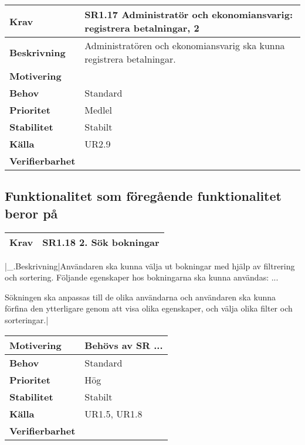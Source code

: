\documentclass[a4paper, twoside, 11pt, titlepage]{article}
\begin{document}
	\begin{tabular} { p{2.6cm} p{12.5cm} }
		\hline
		\sffamily\textbf{Krav} & \sffamily\textbf{SR1.17 Administratör och ekonomiansvarig: registrera betalningar, 2 } \\
		\hline
		\sffamily\textbf{Beskrivning} & Administratören och ekonomiansvarig ska kunna registrera betalningar.  \\
		\hline
		\sffamily\textbf{Motivering} &   \\
		\hline
		\sffamily\textbf{Behov} & Standard  \\
		\hline
		\sffamily\textbf{Prioritet} & Medlel  \\
		\hline
		\sffamily\textbf{Stabilitet} & Stabilt  \\
		\hline
		\sffamily\textbf{Källa} & UR2.9  \\
		\hline
		\sffamily\textbf{Verifierbarhet} &   \\
		\hline
	\end{tabular}


	\subsection{Funktionalitet som föregående funktionalitet beror på}


	\begin{tabular} { p{2.6cm} p{12.5cm} }
		\hline
		\sffamily\textbf{Krav} & \sffamily\textbf{SR1.18 2. Sök bokningar } \\
		\hline
	\end{tabular}
	\vspace{6mm}

	|\_.Beskrivning|Användaren ska kunna välja ut bokningar med hjälp av filtrering och sortering. Följande egenskaper hos bokningarna ska kunna användas: ...

	Sökningen ska anpassas till de olika användarna och användaren ska kunna förfina den ytterligare genom att visa olika egenskaper, och välja olika filter och sorteringar.|

	\begin{tabular} { p{2.6cm} p{12.5cm} }
		\hline
		\sffamily\textbf{Motivering} & Behövs av SR ...  \\
		\hline
		\sffamily\textbf{Behov} & Standard  \\
		\hline
		\sffamily\textbf{Prioritet} & Hög  \\
		\hline
		\sffamily\textbf{Stabilitet} & Stabilt  \\
		\hline
		\sffamily\textbf{Källa} & UR1.5, UR1.8  \\
		\hline
		\sffamily\textbf{Verifierbarhet} &   \\
		\hline
	\end{tabular}
	\vspace{6mm}
\end{document}
